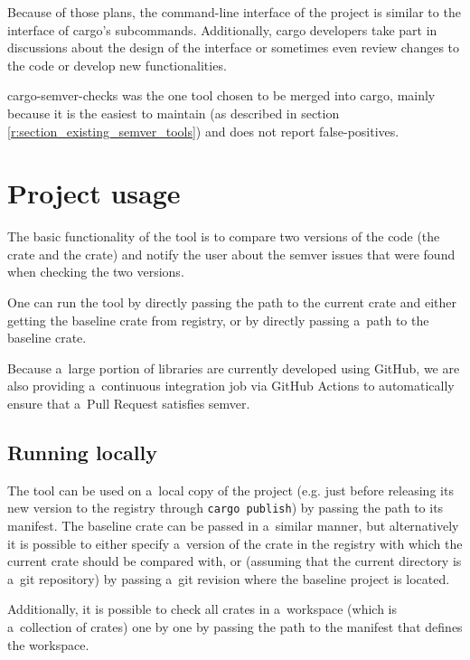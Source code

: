 \documentclass[licencjacka,en]{pracamgr}
\begin{document}
Because of those plans, the command-line interface of the project is similar to the interface of
cargo's subcommands. Additionally, cargo developers take part in discussions about the design of
the interface \cite{issue-cli-interface} or sometimes even review changes to the code or develop
new functionalities.

cargo-semver-checks was the one tool chosen to be merged into cargo, mainly because it is the
easiest to maintain (as described in section \ref{r:section_existing_semver_tools}) and does not
report false-positives.

\section{Project usage}\label{r:section_project_usage}

The basic functionality of the tool is to compare two versions of the code (the  crate
and the  crate) and notify the user about the semver issues that were found when
checking the two versions.

One can run the tool by directly passing the path to the current crate and either getting the
baseline crate from registry, or by directly passing a~path to the baseline crate.

Because a~large portion of libraries are currently developed using GitHub, we are also providing
a~continuous integration job via GitHub Actions to automatically ensure that a~Pull Request
satisfies semver.

\subsection{Running locally}\label{r:subsection_running_locally}

The tool can be used on a~local copy of the project (e.g. just before releasing its new
version to the registry through \texttt{cargo publish}) by passing the path to its manifest.
The baseline crate can be passed in a~similar manner, but alternatively it is possible to either
specify a~version of the crate in the registry with which the current crate should be compared
with, or (assuming that the current directory is a~git repository) by passing a~git revision where
the baseline project is located.

Additionally, it is possible to check all crates in a~workspace (which is a~collection of crates)
one by one by passing the path to the manifest that defines the workspace.
\end{document}
